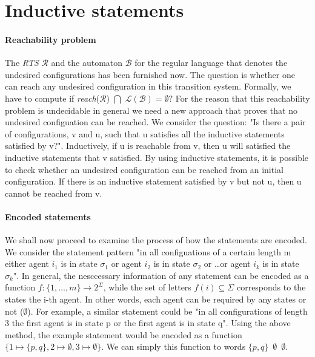 \section{Inductive statements}\label{section:inductive_statements}
\paragraph*{Reachability problem}
The \textit{RTS} $\mathcal{R}$ and the automaton $\mathcal{B}$ for the regular language that denotes the undesired configurations has been furnished now.
The question is whether one can reach any undesired 
configuration in this transition system.
Formally, we have to compute
if \textit{reach}($\mathcal{R}$)
$\bigcap$ $\mathcal{L}(\mathcal{B}) = \emptyset?$
For the reason that this reachability problem is undecidable
in general we need a new approach that proves that
no undesired configuation can be reached. 
We consider the question: "Is there a pair of configurations, v and u, such that u satisfies all the inductive statements satisfied by v?".
Inductively, if u is reachable from v, then u will satisfied the inductive statements that v satisfied.
By using inductive statements, it is possible to check whether an undesired configuration can be reached from an initial configuration.
If there is an inductive statement satisfied by v but not u, then u cannot be reached from v.

\paragraph*{Encoded statements}
We shall now proceed to examine the process of how the statements are encoded.
We consider the statement pattern "in all configuations of a certain length
m either agent $i_1$ is in state $\sigma_1$ or agent $i_2$ is in state
$\sigma_2$ or \dots or agent $i_k$ is in state $\sigma_k$".
In general, the nesccessary information of any statement can be encoded
as a function $f: \lbrace 1, \dots, m\rbrace \rightarrow 2^{\Sigma}$, 
while the set of letters $f(i) \subseteq \Sigma$ corresponds to the states the i-th 
agent. In other words, each agent can be  required by any states or not ($\emptyset$).
For example, a similar statement could be "in all configurations of length 3 the first
agent is in state p or the first agent is in state q". Using the above
method, the example statement would be encoded as a function
$\lbrace 1 \mapsto \lbrace p,q \rbrace, 2 \mapsto \emptyset, 3 \mapsto \emptyset \rbrace$.
We can simply this function to words $\lbrace p,q \rbrace$  $\,\emptyset$ $\,\emptyset$.

